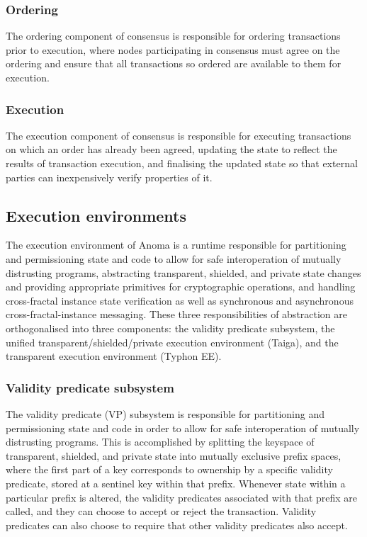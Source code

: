 \documentclass[
    9pt,            %
    commun,        %
    affiltop,       %
]{art}
\begin{document}
\subsubsection{Ordering}\label{ordering}

The ordering component of consensus is responsible for ordering
transactions prior to execution, where nodes participating in consensus
must agree on the ordering and ensure that all transactions so ordered
are available to them for execution.

\subsubsection{Execution}\label{execution-1}

The execution component of consensus is responsible for executing
transactions on which an order has already been agreed, updating the
state to reflect the results of transaction execution, and finalising
the updated state so that external parties can inexpensively verify
properties of it.

\subsection{Execution environments}\label{execution-environments}

The execution environment of Anoma is a runtime responsible for
partitioning and permissioning state and code to allow for safe
interoperation of mutually distrusting programs, abstracting
transparent, shielded, and private state changes and providing
appropriate primitives for cryptographic operations, and handling
cross-fractal instance state verification as well as synchronous and
asynchronous cross-fractal-instance messaging. These three
responsibilities of abstraction are orthogonalised into three
components: the validity predicate subsystem, the unified
transparent/shielded/private execution environment (Taiga), and the
transparent execution environment (Typhon EE).

\subsubsection{Validity predicate
subsystem}\label{validity-predicate-subsystem}

The validity predicate (VP) subsystem is responsible for partitioning
and permissioning state and code in order to allow for safe
interoperation of mutually distrusting programs. This is accomplished by
splitting the keyspace of transparent, shielded, and private state into
mutually exclusive prefix spaces, where the first part of a key
corresponds to ownership by a specific validity predicate, stored at a
sentinel key within that prefix. Whenever state within a particular
prefix is altered, the validity predicates associated with that prefix
are called, and they can choose to accept or reject the transaction.
Validity predicates can also choose to require that other validity
predicates also accept.
\end{document}
